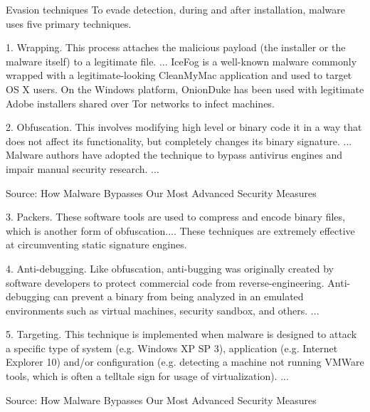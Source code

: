 \documentclass[20pt,landscape,a4paper,footrule]{foils}
\begin{document}

Evasion techniques
To evade detection, during and after installation, malware uses five primary techniques.
\begin{list1}
\item 1. Wrapping. This process attaches the malicious payload (the installer or the malware itself) to a legitimate file.
... IceFog is a well-known malware commonly wrapped with a legitimate-looking CleanMyMac application and used to target OS X users. On the Windows platform, OnionDuke has been used with legitimate Adobe installers shared over Tor networks to infect machines.
\item 2. Obfuscation. This involves modifying high level or binary code it in a way that does not affect its functionality, but completely changes its binary signature. ... Malware authors have adopted the technique to bypass antivirus engines and impair manual security research. ...
\end{list1}

Source: How Malware Bypasses Our Most Advanced Security Measures\\
{\tiny{}}


\begin{list1}
\item 3. Packers. These software tools are used to compress and encode binary files, which is another form of obfuscation.... These techniques are extremely effective at circumventing static signature engines.
\item 4. Anti-debugging. Like obfuscation, anti-bugging was originally created by software developers to protect commercial code from reverse-engineering. Anti-debugging can prevent a binary from being analyzed in an emulated environments such as virtual machines, security sandbox, and others. ...
\item 5.  Targeting. This technique is implemented when malware is designed to attack a specific type of system (e.g. Windows XP SP 3), application (e.g. Internet Explorer 10) and/or configuration (e.g. detecting a machine not running VMWare tools, which is often a telltale sign for usage of virtualization). ...
\end{list1}

Source: How Malware Bypasses Our Most Advanced Security Measures\\
{\tiny{}}
\end{document}

